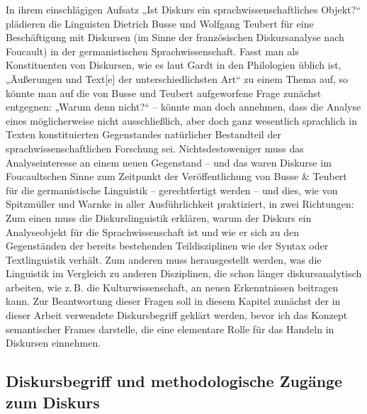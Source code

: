 In ihrem einschlägigen Aufsatz „Ist Diskurs ein sprachwissenschaftliches Objekt?{}`` \autocite{busseIstDiskursSprachwissenschaftliches1994} plädieren die Linguisten Dietrich Busse und Wolfgang Teubert für eine Beschäftigung mit Diskursen (im Sinne der französischen Diskursanalyse nach Foucault) in der germanistischen Sprachwissenschaft. Fasst man als Konstituenten von Diskursen, wie es laut Gardt \autocite*[30]{gardtDiskursanalyseAktuellerTheoretischer2007} in den Philologien üblich ist, „Äußerungen und Text{[}e{]} der unterschiedlichsten Art`` zu einem Thema auf, so könnte man auf die von Busse und Teubert aufgeworfene Frage zunächst entgegnen: „Warum denn nicht?{}`` – könnte man doch annehmen, dass die Analyse eines möglicherweise nicht ausschließlich, aber doch ganz wesentlich sprachlich in Texten konstituierten Gegenstandes natürlicher Bestandteil der sprachwissenschaftlichen Forschung sei. Nichtsdestoweniger muss das Analyseinteresse an einem neuen Gegenstand -- und das waren Diskurse im Foucaultschen Sinne zum Zeitpunkt der Veröffentlichung von Busse \& Teubert \autocite*{busseIstDiskursSprachwissenschaftliches1994} für die germanistische Linguistik -- gerechtfertigt werden -- und dies, wie von Spitzmüller und Warnke \autocite*{spitzmullerDiskurslinguistikEinfuhrungTheorien2011} in aller Ausführlichkeit praktiziert, in zwei Richtungen: Zum einen muss die Diskurslinguistik erklären, warum der Diskurs ein Analyseobjekt für die Sprachwissenschaft ist und wie er sich zu den Gegenständen der bereits bestehenden Teildisziplinen wie der Syntax oder Textlinguistik verhält. Zum anderen muss herausgestellt werden, was die Linguistik im Vergleich zu anderen Disziplinen, die schon länger diskursanalytisch arbeiten, wie z.\,B. die Kulturwissenschaft, an neuen Erkenntnissen beitragen kann. Zur Beantwortung dieser Fragen soll in diesem Kapitel zunächst der in dieser Arbeit verwendete Diskursbegriff geklärt werden, bevor ich das Konzept semantischer Frames darstelle, die eine elementare Rolle für das Handeln in Diskursen einnehmen.

\subsection{Diskursbegriff und methodologische Zugänge zum Diskurs}\label{diskursbegriff-und-methodologische-zugaenge-zum-diskurs}

